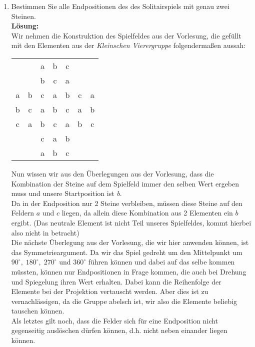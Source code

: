 \documentclass[11pt,a4paper,ngerman]{article}
\begin{document}
\begin{enumerate}[\bfseries (a)]

\item Bestimmen Sie alle Endpositionen des des Solitairspiels mit genau zwei Steinen.\\

\textbf{Lösung:}\\
Wir nehmen die Konstruktion des Spielfeldes aus der Vorlesung, die gefüllt mit den Elementen aus der \emph{Kleinschen Vierergruppe} folgendermaßen aussah:\\

\begin{center}
\begin{tabular}{|cc|ccc|cc|}
\hline
&&a&b&c&&\\
&&b&c&a&&\\
\hline
a&b&c&a&b&c&a\\
b&c&a&b&c&a&b\\
c&a&b&c&a&b&c\\
\hline
&&c&a&b&&\\
&&a&b&c&&\\
\hline
\end{tabular}
\end{center}

Nun wissen wir aus den Überlegungen aus der Vorlesung, dass die Kombination der Steine auf dem Spielfeld immer den selben Wert ergeben muss und unsere Startposition ist \emph{b}.\\
Da in der Endposition nur 2 Steine verbleiben, müssen diese Steine auf den Feldern $a$ und $c$ liegen, da allein diese Kombination aus 2 Elementen ein $b$ ergibt. (Das neutrale Element ist nicht Teil unseres Spielfeldes, kommt hierbei also nicht in betracht)\\

Die nächste Überlegung aus der Vorlesung, die wir hier anwenden können, ist das Symmetrieargument. Da wir das Spiel gedreht um den Mittelpunkt um $90^\circ , \; 180^\circ , \; 270^\circ $ und $360^\circ$ führen können und dabei auf das selbe kommen müssten, können nur Endpositionen in Frage kommen, die auch bei Drehung und Spiegelung ihren Wert erhalten. Dabei kann die Reihenfolge der Elemente bei der Projektion vertauscht werden. Aber dies ist zu vernachlässigen, da die Gruppe abelsch ist, wir also die Elemente beliebig tauschen können.\\

Als letztes gilt noch, dass die Felder sich für eine Endposition nicht gegenseitig auslöschen dürfen können, d.h. nicht neben einander liegen können.\\


\end{enumerate}
\end{document}
